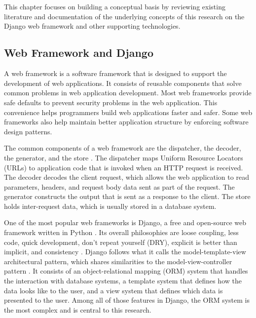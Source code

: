 \chapter{\babDua}

This chapter focuses on building a conceptual basis by reviewing existing
literature and documentation of the underlying concepts of this research
on the Django web framework and other supporting technologies.

\section{Web Framework and Django}

A web framework is a software framework that is designed to support the
development of web applications. It consists of reusable components that solve
common problems in web application development. Most web frameworks provide
safe defaults to prevent security problems in the web application. This
convenience helps programmers build web applications faster and safer. Some web
frameworks also help maintain better application structure by enforcing
software design patterns.

The common components of a web framework are the dispatcher, the decoder, the
generator, and the store \cite{schwarz_webframework}. The dispatcher maps
Uniform Resource Locators (URLs) to application code that is invoked when an
HTTP request is received. The decoder decodes the client request, which allows
the web application to read parameters, headers, and request body data sent as
part of the request. The generator constructs the output that is sent as a
response to the client. The store holds inter-request data, which is usually
stored in a database system.

One of the most popular web frameworks is Django, a free and open-source web
framework written in Python \cite{django}. Its overall philosophies are loose
coupling, less code, quick development, don't repeat yourself (DRY), explicit
is better than implicit, and consistency \cite{django:philosophies}. Django
follows what it calls the model-template-view architectural pattern, which
shares similarities to the model-view-controller pattern \cite{django:faq}. It
consists of an object-relational mapping (ORM) system that handles the
interaction with database systems, a template system that defines how the data
looks like to the user, and a view system that defines which data is presented
to the user. Among all of those features in Django, the ORM system is the most
complex and is central to this research.

